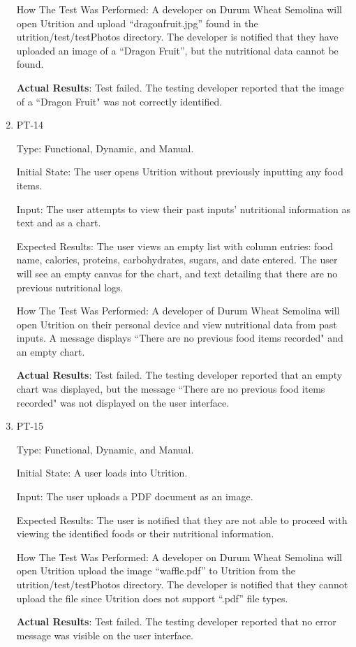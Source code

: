 \documentclass[12pt, titlepage]{article}
\begin{document}
\begin{enumerate}
		How The Test Was Performed: A developer on Durum Wheat Semolina will open Utrition and upload “dragonfruit.jpg” found in the utrition/test/testPhotos directory. The developer is notified that they have uploaded an image of a “Dragon Fruit”, but the nutritional data cannot be found.
		
		\textbf{Actual Results}: Test failed. The testing developer reported that the image of a ``Dragon Fruit" was not correctly identified.
		
		\item{PT-14} 
		
		Type: Functional, Dynamic, and Manual.
		
		Initial State: The user opens Utrition without previously inputting any food items.
		
		Input: The user attempts to view their past inputs' nutritional information as text and as a chart.
		
		Expected Results: The user views an empty list with column entries: food name, calories, proteins, carbohydrates, sugars, and date entered. The user will see an empty canvas for the chart, and text detailing that there are no previous nutritional logs.
		
		How The Test Was Performed: A developer of Durum Wheat Semolina will open Utrition on their personal device and view nutritional data from past inputs. A message displays ``There are no previous food items recorded" and an empty chart.
		
		\textbf{Actual Results}: Test failed. The testing developer reported that an empty chart was displayed, but the message ``There are no previous food items recorded" was not displayed on the user interface.
		
		\item{PT-15}
		
		Type: Functional, Dynamic, and Manual.
		
		Initial State: A user loads into Utrition.
		
		Input: The user uploads a PDF document as an image.
		
		Expected Results: The user is notified that they are not able to proceed with viewing the identified foods or their nutritional information.
		
		How The Test Was Performed: A developer on Durum Wheat Semolina will open Utrition upload the image “waffle.pdf” to Utrition from the utrition/test/testPhotos directory. The developer is notified that they cannot upload the file since Utrition does not support “.pdf” file types.
		
		\textbf{Actual Results}: Test failed. The testing developer reported that no error message was visible on the user interface.
		
	\end{enumerate}
	
\end{document}
